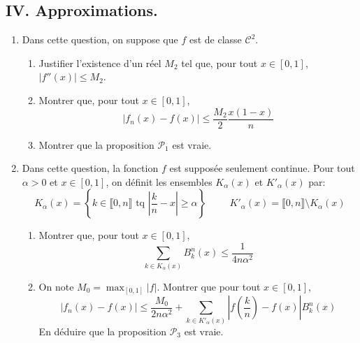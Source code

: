 \subsection*{IV. Approximations.}
\begin{enumerate}
 \item Dans cette question, on suppose que $f$ est de classe $\mathcal{C}^2$.
\begin{enumerate}
 \item  Justifier l'existence d'un réel $M_2$ tel que, pour tout $x\in[0,1]$, $|f''(x)|\leq M_2$. 
 \item  Montrer que, pour tout $x\in [0,1]$,
\begin{displaymath}
 \left|f_n(x) -f(x)\right| \leq \frac{M_2}{2} \frac{x(1-x)}{n}
\end{displaymath}
 \item Montrer que la proposition $\mathcal{P}_1$ est vraie.
\end{enumerate}

\item Dans cette question, la fonction $f$ est supposée seulement continue.\newline
Pour tout $\alpha>0$ et $x\in [0,1]$, on définit les ensembles $K_\alpha(x)$ et $K'_\alpha(x)$ par:
\begin{displaymath}
 K_\alpha(x) = \left\lbrace k\in \llbracket 0, n \rrbracket \text{ tq } \left|\frac{k}{n} -x\right|\geq \alpha \right\rbrace 
\hspace{1cm} K'_\alpha(x)  = \llbracket 0, n \rrbracket \setminus K_\alpha(x)  
\end{displaymath}
\begin{enumerate}
 \item Montrer que, pour tout $x\in [0,1]$,
\begin{displaymath}
 \sum_{k\in K_\alpha(x)}B^n_k(x) \leq \frac{1}{4n\alpha^2}
\end{displaymath}
\item On note $M_0 = \max_{[0,1]}|f|$. Montrer que pour tout $x\in [0,1]$,
\begin{displaymath}
 \left|f_n(x) - f(x)\right|\leq \frac{M_0}{2n\alpha^2} + \sum_{k\in K'_\alpha(x)}\left|f(\frac{k}{n})-f(x)\right|B^n_k(x)
\end{displaymath}
En déduire que la proposition $\mathcal{P}_3$ est vraie.
\end{enumerate}
\end{enumerate}

